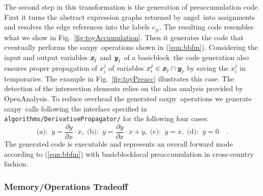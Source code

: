 \documentclass{book}
\newcommand{\angel}{angel}
\newcommand{\basicblock}{basicblock}
\newcommand{\OpenAnalysis}{OpenAnalysis}
\newcommand{\saxpy}{saxpy}
\newcommand{\bmx}{\mbox{\bf\em x}}
\newcommand{\bmy}{\mbox{\bf\em y}}
\newcommand{\reffig}[1]{{Fig.~\ref{#1}}}
\newcommand{\refeqn}[1]{{(\ref{#1})}}
\begin{document}
The second step in this transformation is the generation of 
preaccumulation code. 
First it  turns the abstract expression graphs returned by \angel\ 
into assignments and resolves the edge references into 
the  labels $c_{ji}$. The resulting code resembles what 
we show in  \reffig{fig:toyAccumulation}. 
Then it generates the code that eventually performs the \saxpy\ 
operations shown in \refeqn{eqn:bbfm}. 
Considering the input and output variables $\bmx_j$ and $\bmy_j$ of a \basicblock\ the code generation 
also ensures proper propagation of $\dot{x}_i^j$ of variables $ x_i^j \in  \bmx_j \cap \bmy_j$ 
by saving the $\dot{x}_i^j$ in temporaries. The example in \reffig{fig:toyPreacc} illustrates this case. 
The detection of the intersection elements relies on the alias analysis provided by 
\OpenAnalysis.
To reduce overhead 
the generated \saxpy\ operations we generate \saxpy\ calls following the 
interface specified in \lstinline{algorithms/DerivativePropagator/} for the following four cases:
\begin{equation}\label{eqn:fourSaxpy}  
  \mbox{(a):}\;\;\dot{y} = \frac{\partial y }{\partial x }\cdot \dot{x},\; 
  \mbox{(b):}\;\;\dot{y} = \frac{\partial y }{\partial x }\cdot \dot{x} + \dot{y},\; 
  \mbox{(c):}\;\;\dot{y} = \dot{x},\;
  \mbox{(d):}\;\;\dot{y} = 0\quad .
\end{equation}	
The generated code is executable and represents an overall forward mode 
according to \refeqn{eqn:bbfm} with \basicblock\-local preaccumulation in 
cross-country fashion. 

\subsubsection{Memory/Operations Tradeoff}\label{sec:MMTradeOff}
\end{document}
